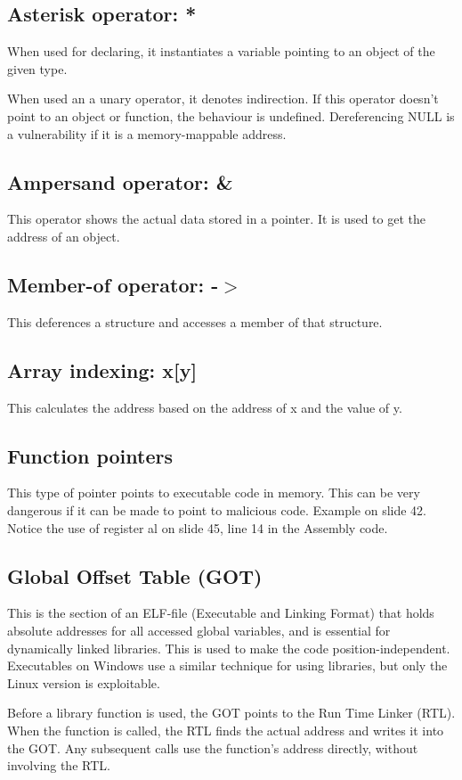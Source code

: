 \documentclass[letterpaper]{article}
\newcommand{\p}{\vspace{1em}\par}		%
\begin{document}
\subsection{Asterisk operator: *}
When used for declaring, it instantiates a variable pointing to an object of the given type.

\p When used an a unary operator, it denotes indirection. If this operator doesn't point to an object or function, the behaviour is undefined. Dereferencing NULL is a vulnerability if it is a memory-mappable address.

\subsection{Ampersand operator: \&}
This operator shows the actual data stored in a pointer. It is used to get the address of an object.

\subsection{Member-of operator: -$>$ }
This deferences a structure and accesses a member of that structure.

\subsection{Array indexing: x[y]}
This calculates the address based on the address of x and the value of y.

\subsection{Function pointers}
This type of pointer points to executable code in memory. This can be very dangerous if it can be made to point to malicious code. Example on slide 42. Notice the use of register al on slide 45, line 14 in the Assembly code.

\subsection{Global Offset Table (GOT)}
This is the section of an ELF-file (Executable and Linking Format) that holds absolute addresses for all accessed global variables, and is essential for dynamically linked libraries. This is used to make the code position-independent. Executables on Windows use a similar technique for using libraries, but only the Linux version is exploitable.

\p Before a library function is used, the GOT points to the Run Time Linker (RTL). When the function is called, the RTL finds the actual address and writes it into the GOT. Any subsequent calls use the function's address directly, without involving the RTL.
\end{document}
